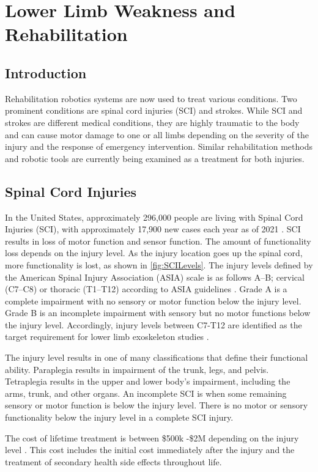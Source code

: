 \section{Lower Limb Weakness and Rehabilitation}
\subsection{Introduction}
Rehabilitation robotics systems are now used to treat various conditions. 
Two prominent conditions are spinal cord injuries (SCI) and strokes. While SCI and strokes are different medical conditions, they are highly traumatic to the body and can cause motor damage to one or all limbs depending on the severity of the injury and the response of emergency intervention. Similar rehabilitation methods and robotic tools are currently being examined as a treatment for both injuries.  


\subsection{Spinal Cord Injuries}
In the United States, approximately 296,000 people are living with Spinal Cord Injuries (SCI), with approximately 17,900 new cases each year as of 2021 \cite{national2021facts}. SCI results in loss of motor function and sensor function. The amount of functionality loss depends on the injury level. As the injury location goes up the spinal cord, more functionality is lost, as shown in \autoref{fig:SCILevels}. The injury levels defined by the  American Spinal Injury Association (ASIA)  scale is as follows A–B; cervical (C7–C8) or thoracic (T1–T12) according to ASIA guidelines \cite{kirshblum2011international}. Grade A is a complete impairment with no sensory or motor function below the injury level. Grade B is an incomplete impairment with sensory but no motor functions below the injury level. Accordingly, injury levels between C7-T12 are identified as the target requirement for lower limb exoskeleton studies \cite{esquenazi2012rewalk}. 

The injury level results in one of many classifications that define their functional ability. Paraplegia results in impairment of the trunk, legs, and pelvis. Tetraplegia results in the upper and lower body's impairment, including the arms, trunk, and other organs. An incomplete SCI is when some remaining sensory or motor function is below the injury level. There is no motor or sensory functionality below the injury level in a complete SCI injury. 

The cost of lifetime treatment is between \$500k -\$2M depending on the injury level \cite{mcdonald2002spinal}. This cost includes the initial cost immediately after the injury and the treatment of secondary health side effects throughout life.  

